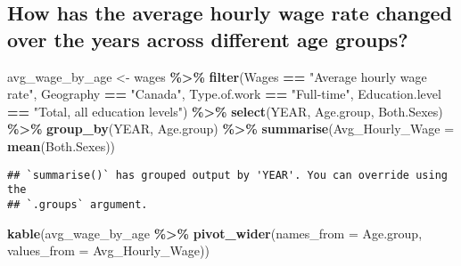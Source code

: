\documentclass[
]{article}
\newenvironment{Shaded}{\begin{snugshade}}{\end{snugshade}}
\newcommand{\AttributeTok}[1]{\textcolor[rgb]{0.13,0.29,0.53}{#1}}
\newcommand{\FunctionTok}[1]{\textcolor[rgb]{0.13,0.29,0.53}{\textbf{#1}}}
\newcommand{\NormalTok}[1]{#1}
\newcommand{\OtherTok}[1]{\textcolor[rgb]{0.56,0.35,0.01}{#1}}
\newcommand{\SpecialCharTok}[1]{\textcolor[rgb]{0.81,0.36,0.00}{\textbf{#1}}}
\newcommand{\StringTok}[1]{\textcolor[rgb]{0.31,0.60,0.02}{#1}}
\begin{document}
\subsection{How has the average hourly wage rate changed over the years
across different age
groups?}\label{how-has-the-average-hourly-wage-rate-changed-over-the-years-across-different-age-groups}

\begin{Shaded}
\begin{Highlighting}[]
\NormalTok{avg\_wage\_by\_age }\OtherTok{\textless{}{-}}\NormalTok{ wages }\SpecialCharTok{\%\textgreater{}\%}
  \FunctionTok{filter}\NormalTok{(Wages }\SpecialCharTok{==} \StringTok{"Average hourly wage rate"}\NormalTok{,}
\NormalTok{         Geography }\SpecialCharTok{==} \StringTok{"Canada"}\NormalTok{,}
\NormalTok{         Type.of.work }\SpecialCharTok{==} \StringTok{"Full{-}time"}\NormalTok{,}
\NormalTok{         Education.level }\SpecialCharTok{==} \StringTok{"Total, all education levels"}\NormalTok{) }\SpecialCharTok{\%\textgreater{}\%}
  \FunctionTok{select}\NormalTok{(YEAR, Age.group, Both.Sexes) }\SpecialCharTok{\%\textgreater{}\%}
  \FunctionTok{group\_by}\NormalTok{(YEAR, Age.group) }\SpecialCharTok{\%\textgreater{}\%}
  \FunctionTok{summarise}\NormalTok{(}\AttributeTok{Avg\_Hourly\_Wage =} \FunctionTok{mean}\NormalTok{(Both.Sexes))}
\end{Highlighting}
\end{Shaded}

\begin{verbatim}
## `summarise()` has grouped output by 'YEAR'. You can override using the
## `.groups` argument.
\end{verbatim}

\begin{Shaded}
\begin{Highlighting}[]
\FunctionTok{kable}\NormalTok{(avg\_wage\_by\_age }\SpecialCharTok{\%\textgreater{}\%}
  \FunctionTok{pivot\_wider}\NormalTok{(}\AttributeTok{names\_from =}\NormalTok{ Age.group, }\AttributeTok{values\_from =}\NormalTok{ Avg\_Hourly\_Wage))}
\end{Highlighting}
\end{Shaded}
\end{document}
